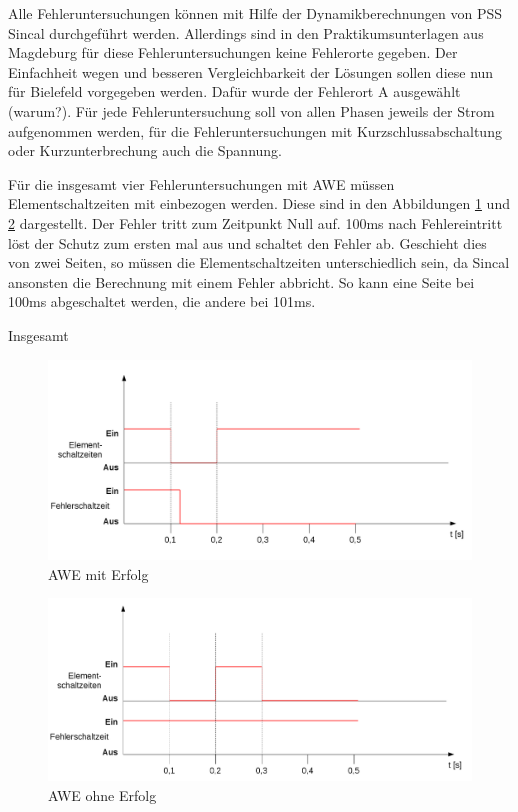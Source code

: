 \documentclass{scrartcl}
\begin{document}
\begin{onehalfspace}
Alle Fehleruntersuchungen können mit Hilfe der Dynamikberechnungen von PSS Sincal durchgeführt werden. Allerdings sind in den Praktikumsunterlagen aus Magdeburg für diese Fehleruntersuchungen keine Fehlerorte gegeben. Der Einfachheit wegen und besseren Vergleichbarkeit der Lösungen sollen diese nun für Bielefeld vorgegeben werden. Dafür wurde der Fehlerort A ausgewählt (warum?). Für jede Fehleruntersuchung soll von allen Phasen jeweils der Strom aufgenommen werden, für die Fehleruntersuchungen mit Kurzschlussabschaltung oder Kurzunterbrechung auch die Spannung.

Für die insgesamt vier Fehleruntersuchungen mit AWE müssen Elementschaltzeiten mit einbezogen werden. Diese sind in den Abbildungen \ref{awe-me} und \ref{awe-oe} dargestellt. Der Fehler tritt zum Zeitpunkt Null auf. 100ms nach Fehlereintritt löst der Schutz zum ersten mal aus und schaltet den Fehler ab. Geschieht dies von zwei Seiten, so müssen die Elementschaltzeiten unterschiedlich sein, da Sincal ansonsten die Berechnung mit einem Fehler abbricht. So kann eine Seite bei 100ms abgeschaltet werden, die andere bei 101ms.

Insgesamt

	\begin{figure}[H]
	\centering
	\includegraphics[scale=0.45]{img/awe-me.png}
	\caption{AWE mit Erfolg}
	\label{awe-me}
	\end{figure}

	\begin{figure}[H]
	\centering
	\includegraphics[scale=0.45]{img/awe-oe.png}
	\caption{AWE ohne Erfolg}
	\label{awe-oe}
	\end{figure}



\end{onehalfspace}
\end{document}
